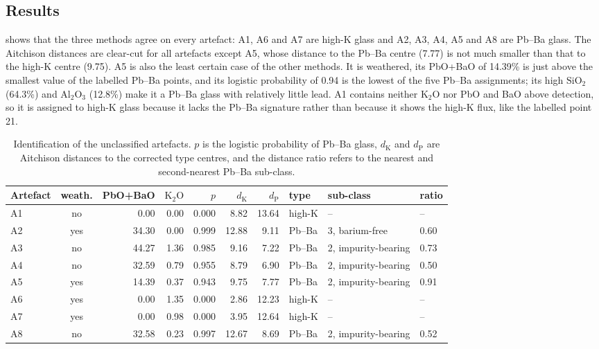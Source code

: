 \documentclass[11pt,a4paper]{article}
\newcommand{\ox}[1]{\ensuremath{\mathrm{#1}}}
\begin{document}
\subsection{Results}
 shows that the three methods agree on every artefact: A1, A6 and A7 are high-K glass and A2, A3, A4, A5 and A8 are Pb--Ba glass.
The Aitchison distances are clear-cut for all artefacts except A5, whose distance to the Pb--Ba centre (7.77) is not much smaller than that to the high-K centre (9.75).
A5 is also the least certain case of the other methods.
It is weathered, its PbO+BaO of 14.39\% is just above the smallest value of the labelled Pb--Ba points, and its logistic probability of 0.94 is the lowest of the five Pb--Ba assignments; its high \ox{SiO_2} (64.3\%) and \ox{Al_2O_3} (12.8\%) make it a Pb--Ba glass with relatively little lead.
A1 contains neither \ox{K_2O} nor PbO and BaO above detection, so it is assigned to high-K glass because it lacks the Pb--Ba signature rather than because it shows the high-K flux, like the labelled point 21.

\begin{table}[ht]
\centering
\setlength{\tabcolsep}{4.5pt}
\caption{Identification of the unclassified artefacts. $p$ is the logistic probability of Pb--Ba glass, $d_{\mathrm K}$ and $d_{\mathrm P}$ are Aitchison distances to the corrected type centres, and the distance ratio refers to the nearest and second-nearest Pb--Ba sub-class.}\label{tab:unk}
\small
\begin{tabular}{lcrrrrrlll}
\toprule
Artefact & weath. & PbO+BaO & \ox{K_2O} & $p$ & $d_{\mathrm K}$ & $d_{\mathrm P}$ & type & sub-class & ratio \\
\midrule
A1 & no & 0.00 & 0.00 & 0.000 & 8.82 & 13.64 & high-K & -- & -- \\
A2 & yes & 34.30 & 0.00 & 0.999 & 12.88 & 9.11 & Pb--Ba & 3, barium-free & 0.60 \\
A3 & no & 44.27 & 1.36 & 0.985 & 9.16 & 7.22 & Pb--Ba & 2, impurity-bearing & 0.73 \\
A4 & no & 32.59 & 0.79 & 0.955 & 8.79 & 6.90 & Pb--Ba & 2, impurity-bearing & 0.50 \\
A5 & yes & 14.39 & 0.37 & 0.943 & 9.75 & 7.77 & Pb--Ba & 2, impurity-bearing & 0.91 \\
A6 & yes & 0.00 & 1.35 & 0.000 & 2.86 & 12.23 & high-K & -- & -- \\
A7 & yes & 0.00 & 0.98 & 0.000 & 3.95 & 12.64 & high-K & -- & -- \\
A8 & no & 32.58 & 0.23 & 0.997 & 12.67 & 8.69 & Pb--Ba & 2, impurity-bearing & 0.52 \\
\bottomrule
\end{tabular}
\end{table}
\end{document}
